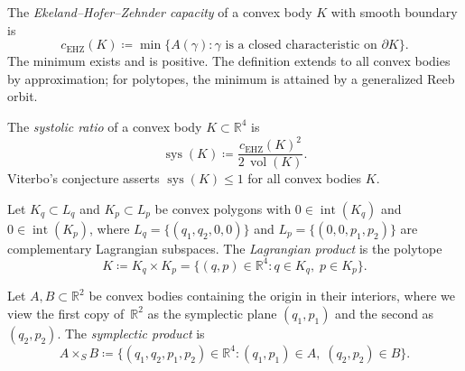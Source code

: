 
\begin{definition}\label{def:ehz-capacity}
The \emph{Ekeland--Hofer--Zehnder capacity} of a convex body $K$ with smooth
boundary is
\[
  c_{\mathrm{EHZ}}(K) \coloneqq \min\bigl\{ A(\gamma) :
  \gamma \text{ is a closed characteristic on } \partial K \bigr\}.
\]
The minimum exists and is positive.
The definition extends to all convex bodies by approximation;
for polytopes, the minimum is attained by a generalized Reeb orbit.
\end{definition}


\begin{unverified}
\begin{definition}\label{def:systolic-ratio}
The \emph{systolic ratio} of a convex body $K \subset \mathbb{R}^4$ is
\[
  \operatorname{sys}(K) \coloneqq \frac{c_{\mathrm{EHZ}}(K)^2}{2\,\operatorname{vol}(K)}.
\]
Viterbo's conjecture asserts $\operatorname{sys}(K) \leq 1$ for all convex bodies $K$.
\end{definition}
\end{unverified}



\begin{unverified}
\begin{definition}\label{def:lagrangian-product}
Let $K_q \subset L_q$ and $K_p \subset L_p$ be convex polygons
with $0 \in \operatorname{int}(K_q)$ and $0 \in \operatorname{int}(K_p)$,
where $L_q = \{(q_1, q_2, 0, 0)\}$ and $L_p = \{(0, 0, p_1, p_2)\}$
are complementary Lagrangian subspaces.
The \emph{Lagrangian product} is the polytope
\[
  K \coloneqq K_q \times K_p
  = \{ (q, p) \in \mathbb{R}^4 : q \in K_q,\; p \in K_p \}.
\]
\end{definition}
\end{unverified}


\begin{unverified}
\begin{definition}\label{def:symplectic-product}
Let $A, B \subset \mathbb{R}^2$ be convex bodies containing
the origin in their interiors, where we view the first copy
of~$\mathbb{R}^2$ as the symplectic plane $(q_1, p_1)$ and
the second as $(q_2, p_2)$.
The \emph{symplectic product} is
\[
  A \times_S B
    \coloneqq \{(q_1, q_2, p_1, p_2) \in \mathbb{R}^4
      : (q_1, p_1) \in A,\; (q_2, p_2) \in B\}.
\]
\end{definition}
\end{unverified}


